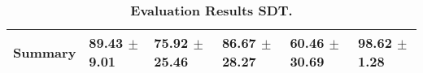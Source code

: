 \begin{table}[htb]
{\begin{tabular}{llllll}
\midrule
\textbf{Summary                                  } &        \phantom{0}89.43 $\pm$ \phantom{0}9.01 &                      \phantom{0}75.92 $\pm$ 25.46 &                  \phantom{0}86.67 $\pm$ 28.27 &            \phantom{0}60.46 $\pm$ 30.69 &  \phantom{0}98.62 $\pm$ \phantom{0}1.28 \\
\bottomrule
\end{tabular}%
}
\caption{\textbf{Evaluation Results SDT.}}
\label{tab:eval-results}
\end{table}


